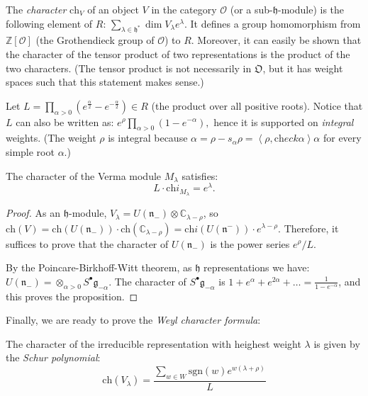 The \emph{character} $\text{ch}_V$ of an object $V$ in the category $\mathcal O$ (or a sub-$\mathfrak h$-module) is the following element of $R$: $\sum_{\lambda \in \mathfrak h^*} \dim V_\lambda e^\lambda$. It defines a group homomorphism from $\mathbb Z[\mathcal O]$ (the Grothendieck group of $\mathcal O$) to $R$. Moreover, it can easily be shown that the character of the tensor product of two representations is the product of the two characters. (The tensor product is not necessarily in $\mathfrak O$, but it has weight spaces such that this statement makes sense.)

Let $L = \prod_{\alpha>0} \left( e^\frac{\alpha}{2} - e^{-\frac{\alpha}{2}}\right) \in R$ (the product over all positive roots). Notice that $L$ can also be written as: $ e^\rho \prod_{\alpha>0} \left( 1 - e^{-{\alpha}}\right), $
hence it is supported on \emph{integral} weights. (The weight $\rho$ is integral because $\alpha = \rho- s_\alpha\rho = \left<\rho,\text{ch}eck\alpha\right> \alpha$ for every simple root $\alpha$.)

\begin{proposition}
 The character of the Verma module $M_\lambda$ satisfies:
$$ L\cdot \text{ch}i_{M_\lambda} = e^\lambda.$$
\end{proposition}

\begin{proof}
 As an $\mathfrak h$-module, $V_\lambda = U(\mathfrak n_-) \otimes \mathbb C_{\lambda-\rho}$, so $\text{ch}(V) = \text{ch}(U(\mathfrak n_-))\cdot \text{ch}(\mathbb C_{\lambda-\rho}) = \text{ch}i(U(\mathfrak n^-))\cdot e^{\lambda-\rho}$. Therefore, it suffices to prove that the character of $U(\mathfrak n_-)$ is the power series $e^\rho/L$.

 By the Poincare-Birkhoff-Witt theorem, as $\mathfrak h$ representations we have: $U(\mathfrak n_-) = \otimes_{\alpha>0} S^\bullet \mathfrak g_{-\alpha}$. The character of $S^\bullet \mathfrak g_{-\alpha}$ is $1+e^{\alpha}+e^{2\alpha}+\dots = \frac{1}{1-e^{-\alpha}}$, and this proves the proposition.
\end{proof}

Finally, we are ready to prove the \emph{Weyl character formula}:

\begin{theorem}
 The character of the irreducible representation with heighest weight $\lambda$ is given by the \emph{Schur polynomial}:
$$ \text{ch}(V_\lambda) = \frac{\sum_{w\in W} \text{sgn}(w) e^{w(\lambda+\rho)}}{L}$$
\end{theorem}

